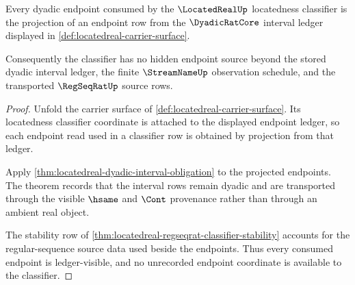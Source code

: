 \begin{theorem}
\label{thm:locatedreal-interval-ledger-exactness}
Every dyadic endpoint consumed by the $\LocatedRealUp$ locatedness classifier is the projection of an endpoint row from the $\DyadicRatCore$ interval ledger displayed in \autoref{def:locatedreal-carrier-surface}.

Consequently the classifier has no hidden endpoint source beyond the stored dyadic interval ledger, the finite $\StreamNameUp$ observation schedule, and the transported $\RegSeqRatUp$ source rows.
\end{theorem}
\begin{proof}
Unfold the carrier surface of \autoref{def:locatedreal-carrier-surface}. Its locatedness classifier coordinate is attached to the displayed endpoint ledger, so each endpoint read used in a classifier row is obtained by projection from that ledger.

Apply \autoref{thm:locatedreal-dyadic-interval-obligation} to the projected endpoints. The theorem records that the interval rows remain dyadic and are transported through the visible $\hsame$ and $\Cont$ provenance rather than through an ambient real object.

The stability row of \autoref{thm:locatedreal-regseqrat-classifier-stability} accounts for the regular-sequence source data used beside the endpoints. Thus every consumed endpoint is ledger-visible, and no unrecorded endpoint coordinate is available to the classifier.
\end{proof}

